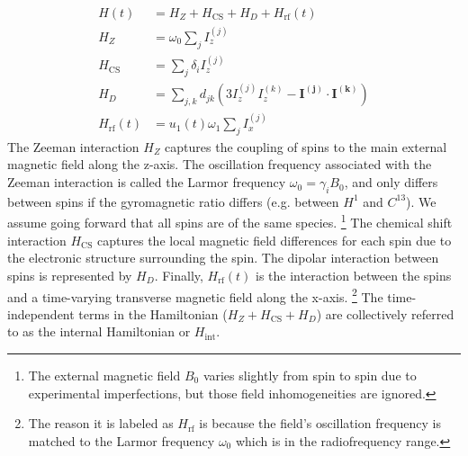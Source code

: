 \begin{align}\label{eq:nmr-ham}
    H(t) &= H_Z + H_\text{CS} + H_D + H_\text{rf}(t) \\
    H_Z &= \omega_0 \sum_j I_z^{(j)} \\
    H_\text{CS} &= \sum_j \delta_i I_z^{(j)} \\
    H_D &= \sum_{j,k} d_{jk} \left( 3I_z^{(j)}I_z^{(k)} - \mathbf{I^{(j)}} \cdot \mathbf{I^{(k)}} \right) \\
    \label{eq:nmr-ham-rf}
    H_{\text{rf}}(t) &=  u_1(t) \omega_1 \sum_j I_x^{(j)}
\end{align}
The Zeeman interaction $H_Z$ captures the coupling of spins to the main external magnetic field along the z-axis. The oscillation frequency associated with the Zeeman interaction is called the Larmor frequency $\omega_0 = \gamma_i B_0$, and only differs between spins if the gyromagnetic ratio differs (e.g. between $H^1$ and $C^{13}$). We assume going forward that all spins are of the same species.%
\footnote{The external magnetic field $B_0$ varies slightly from spin to spin due to experimental imperfections, but those field inhomogeneities are ignored.}
The chemical shift interaction $H_{\text{CS}}$ captures the local magnetic field differences for each spin due to the electronic structure surrounding the spin. The dipolar interaction between spins is represented by $H_D$. Finally, $H_\text{rf}(t)$ is the interaction between the spins and a time-varying transverse magnetic field along the x-axis.%
\footnote{The reason it is labeled as $H_\text{rf}$ is because the field's oscillation frequency is matched to the Larmor frequency $\omega_0$ which is in the radiofrequency range.}
The time-independent terms in the Hamiltonian ($H_Z + H_{\text{CS}} + H_D$) are collectively referred to as the internal Hamiltonian or $H_{\text{int}}$.


